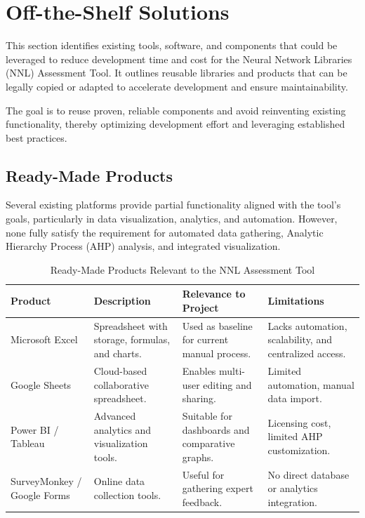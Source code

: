 \documentclass[12pt]{article}
\begin{document}
\section{Off-the-Shelf Solutions}

This section identifies existing tools, software, and components that could be leveraged to reduce development time and cost for the Neural Network Libraries (NNL) Assessment Tool. It outlines reusable libraries and products that can be legally copied or adapted to accelerate development and ensure maintainability.

The goal is to reuse proven, reliable components and avoid reinventing existing functionality, thereby optimizing development effort and leveraging established best practices.

\subsection{Ready-Made Products}

Several existing platforms provide partial functionality aligned with the tool’s goals, particularly in data visualization, analytics, and automation. However, none fully satisfy the requirement for automated data gathering, Analytic Hierarchy Process (AHP) analysis, and integrated visualization.

\begin{table}[hp]
\caption{Ready-Made Products Relevant to the NNL Assessment Tool}
\begin{tabularx}{\textwidth}{p{2.8cm}X X X}
\toprule
\textbf{Product} & \textbf{Description} & \textbf{Relevance to Project} & \textbf{Limitations} \\
\midrule
Microsoft Excel & Spreadsheet with storage, formulas, and charts. & Used as baseline for current manual process. & Lacks automation, scalability, and centralized access. \\
\addlinespace[0.3em]
Google Sheets & Cloud-based collaborative spreadsheet. & Enables multi-user editing and sharing. & Limited automation, manual data import. \\
\addlinespace[0.3em]
Power BI / Tableau & Advanced analytics and visualization tools. & Suitable for dashboards and comparative graphs. & Licensing cost, limited AHP customization. \\
\addlinespace[0.3em]
SurveyMonkey / Google Forms & Online data collection tools. & Useful for gathering expert feedback. & No direct database or analytics integration. \\
\bottomrule
\end{tabularx}
\end{table}
\end{document}
